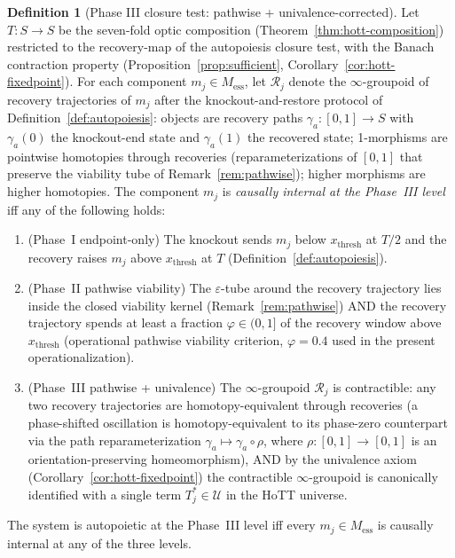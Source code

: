 \documentclass[11pt,a4paper]{article}
\theoremstyle{plain}
\theoremstyle{definition}
\newtheorem{definition}[theorem]{Definition}
\theoremstyle{remark}
\begin{document}
\begin{definition}[Phase III closure test: pathwise + univalence-corrected]
\label{def:autopoiesis-phase3}
Let $T : S \to S$ be the seven-fold optic composition
(Theorem~\ref{thm:hott-composition}) restricted to the recovery-map
of the autopoiesis closure test, with the Banach contraction property
(Proposition~\ref{prop:sufficient}, Corollary~\ref{cor:hott-fixedpoint}).
For each component $m_j \in M_{\mathrm{ess}}$, let
$\mathcal{R}_j$ denote the $\infty$-groupoid of recovery trajectories of
$m_j$ after the knockout-and-restore protocol of
Definition~\ref{def:autopoiesis}: objects are recovery paths
$\gamma_a : [0,1] \to S$ with $\gamma_a(0)$ the knockout-end state and
$\gamma_a(1)$ the recovered state; 1-morphisms are pointwise homotopies
through recoveries (reparameterizations of $[0,1]$ that preserve the
viability tube of Remark~\ref{rem:pathwise}); higher morphisms are higher
homotopies. The component $m_j$ is \emph{causally internal at the
Phase~III level} iff any of the following holds:
\begin{enumerate}[leftmargin=*, itemsep=2pt]
\item (Phase~I endpoint-only) The knockout sends $m_j$ below
  $x_{\mathrm{thresh}}$ at $T/2$ and the recovery raises $m_j$ above
  $x_{\mathrm{thresh}}$ at $T$ (Definition~\ref{def:autopoiesis}).
\item (Phase~II pathwise viability) The $\varepsilon$-tube around the
  recovery trajectory lies inside the closed viability kernel
  (Remark~\ref{rem:pathwise}) AND the recovery trajectory spends at
  least a fraction $\varphi \in (0,1]$ of the recovery window above
  $x_{\mathrm{thresh}}$ (operational pathwise viability criterion,
  $\varphi = 0.4$ used in the present operationalization).
\item (Phase~III pathwise + univalence) The $\infty$-groupoid
  $\mathcal{R}_j$ is contractible: any two recovery trajectories are
  homotopy-equivalent through recoveries (a phase-shifted oscillation
  is homotopy-equivalent to its phase-zero counterpart via the path
  reparameterization $\gamma_a \mapsto \gamma_a \circ \rho$, where
  $\rho : [0,1] \to [0,1]$ is an orientation-preserving homeomorphism),
  AND by the univalence axiom
  (Corollary~\ref{cor:hott-fixedpoint}) the contractible
  $\infty$-groupoid is canonically identified with a single term
  $T_j^* \in \mathcal{U}$ in the HoTT universe.
\end{enumerate}
The system is autopoietic at the Phase~III level iff every $m_j \in
M_{\mathrm{ess}}$ is causally internal at any of the three levels.
\end{definition}
\end{document}
